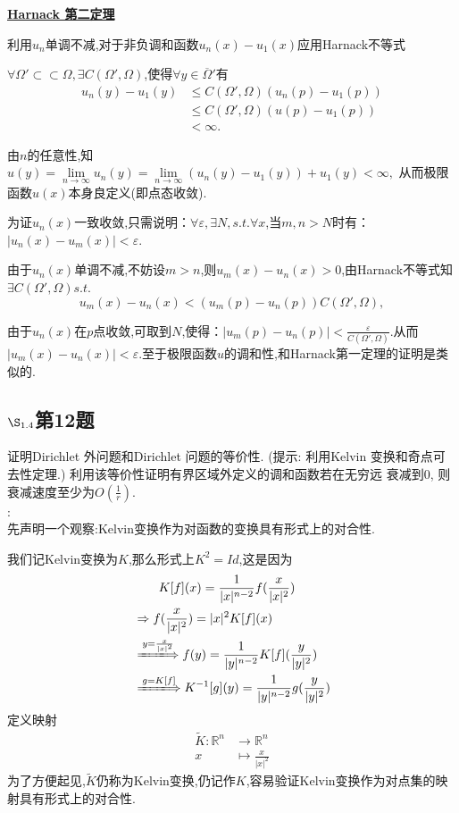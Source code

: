 \documentclass[12pt, a4paper]{ctexbook}
\begin{document}
    \uline{\textbf{Harnack 第二定理}}
    
    利用$u_n$单调不减,对于非负调和函数$u_n(x)-u_1(x)$应用Harnack不等式
    
    $\forall\Omega'\subset \subset \Omega,\exists C(\Omega',\Omega)$,使得$\forall y\in \overline{\Omega}'$有
    \begin{align*}
    u_n(y)-u_1(y)&\leq C(\Omega',\Omega)(u_n(p)-u_1(p))\\&\leq C(\Omega',\Omega)(u(p)-u_1(p))\\&< \infty.
    \end{align*}
    
    由$n$的任意性,知$u(y)=\lim\limits_{n \to \infty}u_n(y)=\lim\limits_{n \to \infty}(u_n(y)-u_1(y))+u_1(y)<\infty,$
    从而极限函数$u(x)$本身良定义(即点态收敛).
    
    为证$u_n(x)$一致收敛,只需说明：$\forall \varepsilon,\exists N,s.t.\forall x$,当$m,n>N$时有：$|u_n(x)-u_m(x)|<\varepsilon.$
    
    由于$u_n(x)$单调不减,不妨设$m>n$,则$u_m(x)-u_n(x)>0$,由Harnack不等式知$\exists C(\Omega',\Omega) s.t.$
    $$u_m(x)-u_n(x)<(u_m(p)-u_n(p))C(\Omega',\Omega),$$
    
    由于$u_n(x)$在$p$点收敛,可取到$N$,使得：$|u_m(p)-u_n(p)|<\frac{\varepsilon}{C(\Omega',\Omega)}.$从而$|u_m(x)-u_n(x)|<\varepsilon.$至于极限函数$u$的调和性,和Harnack第一定理的证明是类似的.
    
    
    
    \subsection{$\S_{1.4}$第12题}
    \kaishu{}证明Dirichlet 外问题和Dirichlet 问题的等价性. (提示: 利用Kelvin 变换和奇点可去性定理.) 利用该等价性证明有界区域外定义的调和函数若在无穷远
    衰减到0, 则衰减速度至少为$O(\frac{1}{r})$.\\
    
    \songti{}:\\
    
    先声明一个观察:Kelvin变换作为对函数的变换具有形式上的对合性.
    
    我们记Kelvin变换为$K$,那么形式上$K^2=Id$,这是因为
    \begin{align*}
    &\qquad K[f](x)=\frac{1}{|x|^{n-2}}f(\frac{x}{|x|^2})\\
    &\Rightarrow f(\frac{x}{|x|^2})=|x|^2 K[f](x)\\
    &\xLongrightarrow{y=\frac{x}{|x|^2}} f(y)=\frac{1}{|y|^{n-2}} K[f](\frac{y}{|y|^2})\\
    &\xLongrightarrow{g=K[f]} K^{-1}[g](y)=\frac{1}{|y|^{n-2}} g(\frac{y}{|y|^2})
    \end{align*}
    定义映射
    \begin{align*}
    \tilde{K}:     \mathbb{R}^n &\rightarrow \mathbb{R}^n\\
    x &\mapsto \frac{x}{|x|^2}
    \end{align*}
    为了方便起见,$\tilde{K}$仍称为Kelvin变换,仍记作$K$,容易验证Kelvin变换作为对点集的映射具有形式上的对合性.
    
\end{document}
